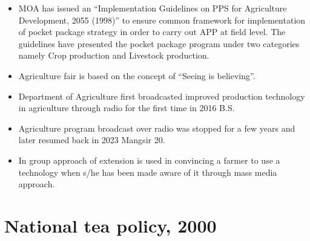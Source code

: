 \documentclass[
  openany]{book}
\providecommand{\tightlist}{%
  \setlength{\itemsep}{0pt}\setlength{\parskip}{0pt}}
\begin{document}
\begin{itemize}
\tightlist
\item
  MOA has issued an ``Implementation Guidelines on PPS for Agriculture Development, 2055 (1998)'' to ensure common framework for implementation of pocket package strategy in order to carry out APP at field level. The guidelines have presented the pocket package program under two categories namely Crop production and Livestock production.
\item
  Agriculture fair is based on the concept of ``Seeing is believing''.
\item
  Department of Agriculture first broadcasted improved production technology in agriculture through radio for the first time in 2016 B.S.
\item
  Agriculture program broadcast over radio was stopped for a few years and later resumed back in 2023 Mangsir 20.
\item
  In group approach of extension is used in convincing a farmer to use a technology when s/he has been made aware of it through mass media approach.
\end{itemize}

\hypertarget{national-tea-policy-2000}{%
\section{National tea policy, 2000}\label{national-tea-policy-2000}}
\end{document}
